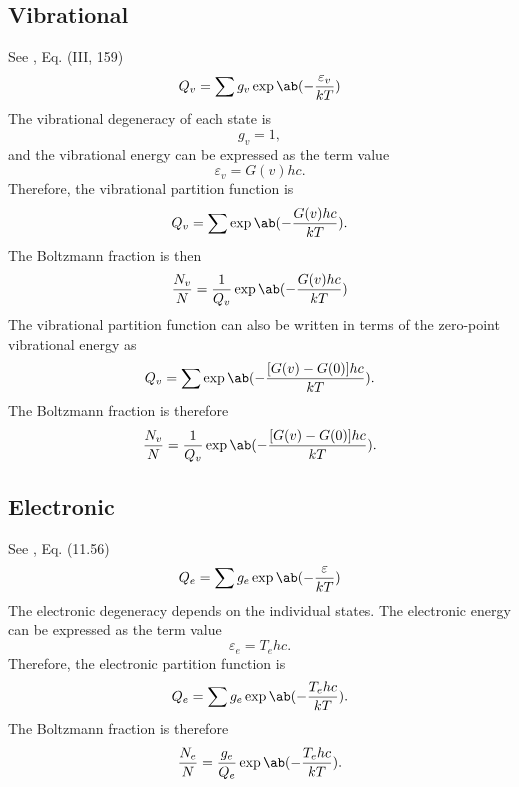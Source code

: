 \documentclass[11pt, twoside, fleqn]{report}
\begin{document}
\subsection{Vibrational}

See \cite{herzbergMolecularSpectraMolecular1950}, Eq. (III, 159)
\begin{equation*}
    Q_v = \sum g_v\exp\ab(-\frac{\varepsilon_v}{kT})
\end{equation*}
The vibrational degeneracy of each state is
\begin{equation*}
    g_v = 1,
\end{equation*}
and the vibrational energy can be expressed as the term value
\begin{equation*}
    \varepsilon_v = G(v)hc.
\end{equation*}
Therefore, the vibrational partition function is
\begin{equation*}
    Q_v = \sum \exp\ab(-\frac{G(v)hc}{kT}).
\end{equation*}
The Boltzmann fraction is then
\begin{equation*}
    \frac{N_v}{N} = \frac{1}{Q_v}\exp\ab(-\frac{G(v)hc}{kT})
\end{equation*}
The vibrational partition function can also be written in terms of the zero-point vibrational energy as
\begin{equation*}
    Q_v = \sum \exp\ab(-\frac{[G(v) - G(0)]hc}{kT}).
\end{equation*}
The Boltzmann fraction is therefore
\begin{equation*}
    \frac{N_v}{N} = \frac{1}{Q_v}\exp\ab(-\frac{[G(v) - G(0)]hc}{kT}).
\end{equation*}

\subsection{Electronic}

See \cite{andersonHypersonicHighTemperatureGas2019}, Eq. (11.56)
\begin{equation*}
    Q_e = \sum g_e\exp\ab(-\frac{\varepsilon}{kT})
\end{equation*}
The electronic degeneracy depends on the individual states. The electronic energy can be expressed as the term value
\begin{equation*}
    \varepsilon_e = T_ehc.
\end{equation*}
Therefore, the electronic partition function is
\begin{equation*}
    Q_e = \sum g_e\exp\ab(-\frac{T_ehc}{kT}).
\end{equation*}
The Boltzmann fraction is therefore
\begin{equation*}
    \frac{N_e}{N} = \frac{g_e}{Q_e}\exp\ab(-\frac{T_ehc}{kT}).
\end{equation*}
\end{document}

